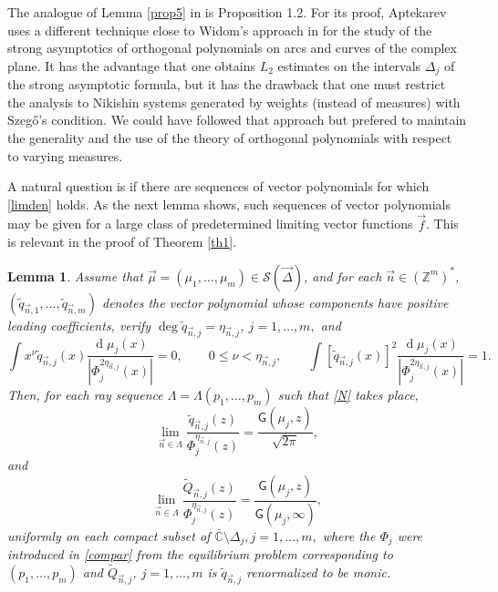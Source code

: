 \documentclass{amsart}
\numberwithin{equation}{section}
\newtheorem{lemma}[theorem]{Lemma}
\theoremstyle{definition}
\DeclareMathOperator{\D}{d}        %
\newcommand{\ZZ}{\mathbb{Z}}      %
\newcommand{\CC}{\mathbb{C}}      %
\newcommand{\n}{\vec{n}}          %
\begin{document}
The analogue of Lemma \ref{prop5} in \cite{sasha99} is Proposition 1.2. For its proof, Aptekarev uses a different technique close to Widom's approach in \cite{widom} for the study of the strong asymptotics of orthogonal polynomials on arcs and curves of the complex plane.  It has the advantage that one obtains $L_2$ estimates on the intervals $\Delta_j$ of the strong asymptotic formula, but it has the drawback that one must restrict the analysis to Nikishin systems generated
by weights  (instead of measures) with Szeg\H{o}'s condition. We could have followed that approach but prefered to maintain the generality and the use of the theory of orthogonal polynomials with respect to varying measures.

A natural question is if there are sequences of vector polynomials for which \eqref{limden} holds.  As the next lemma shows, such sequences of vector polynomials may be given for a large class of  predetermined limiting vector functions $\vec{f}$. This is relevant in the proof of Theorem \ref{th1}.

\begin{lemma}
    \label{prop2}
    Assume that $\vec{\mu} = (\mu_1,\ldots,\mu_m)\in\mathcal{S}(\vec{\Delta})$, and for each $\n\in (\ZZ^m)^* $, $(\tilde{q}_{\n,1}, \ldots, \tilde{q}_{\n,m})$ denotes the vector polynomial whose components have positive leading coefficients, verify $\deg \tilde{q}_{\n,j} = \eta_{\n,j}$, $j=1,\ldots,m,$ and
    \begin{equation}
        \label{poltilde}
        \int x^\nu \tilde{q}_{\n,j}(x)\frac{\D \mu_j(x)}{|\Phi_j^{2\eta_{\n,j}}(x)|} = 0,\qquad 0\leq\nu < \eta_{\n,j},\qquad  \int  [\tilde{q}_{\n,j}(x)]^2\frac{\D \mu_j(x)}{|\Phi_j^{2\eta_{\n,j}}(x)|} = 1.
    \end{equation}
    Then, for each ray sequence $\Lambda = \Lambda(p_1,\ldots,p_m)$ such that  \eqref{N} takes place,
    \begin{equation}
        \label{predet}
        \lim_{\n\in\Lambda} \frac{\tilde{q}_{\n,j}(z)}{\Phi_j^{\eta_{\n,j}}(z)} = \frac{\mathsf{G}(\mu_j,z)}{\sqrt{2\pi}},
    \end{equation}
    and
    \begin{equation}
        \label{predet*}
        \lim_{\n\in\Lambda} \frac{\tilde{Q}_{\n,j}(z)}{\Phi_j^{\eta_{\n,j}}(z)} = \frac{\mathsf{G}(\mu_j,z)}{\mathsf{G}(\mu_j,\infty)},
    \end{equation}
    uniformly on each compact subset of $\overline{\CC} \setminus \Delta_j, j=1,\ldots,m,$ where the $\Phi_j$ were introduced in \eqref{compar} from the equilibrium problem corresponding to $(p_1,\ldots,p_m)$ and $\tilde{Q}_{\n,j}$, $j=1,\ldots,m$ is $\tilde{q}_{\n,j}$ renormalized to be monic.
\end{lemma}
\end{document}
